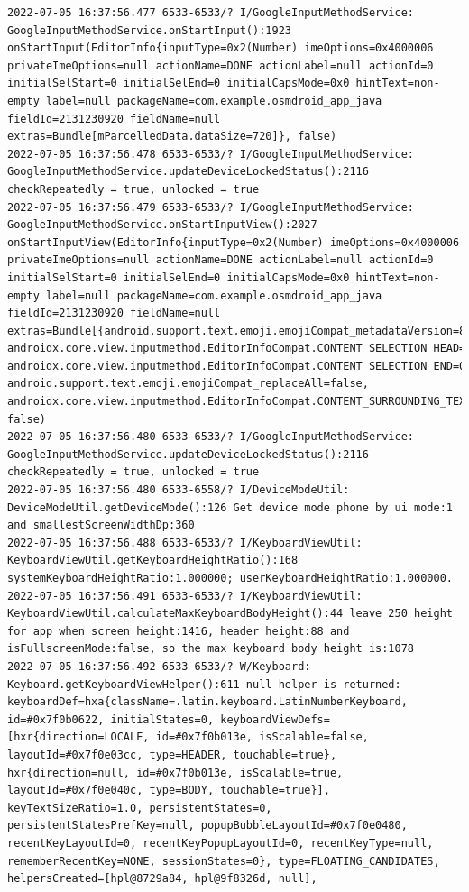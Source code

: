 \documentclass[a4paper,12pt]{book}
\begin{document}
\begin{lstlisting}
2022-07-05 16:37:56.477 6533-6533/? I/GoogleInputMethodService: GoogleInputMethodService.onStartInput():1923 onStartInput(EditorInfo{inputType=0x2(Number) imeOptions=0x4000006 privateImeOptions=null actionName=DONE actionLabel=null actionId=0 initialSelStart=0 initialSelEnd=0 initialCapsMode=0x0 hintText=non-empty label=null packageName=com.example.osmdroid_app_java fieldId=2131230920 fieldName=null extras=Bundle[mParcelledData.dataSize=720]}, false)
2022-07-05 16:37:56.478 6533-6533/? I/GoogleInputMethodService: GoogleInputMethodService.updateDeviceLockedStatus():2116 checkRepeatedly = true, unlocked = true
2022-07-05 16:37:56.479 6533-6533/? I/GoogleInputMethodService: GoogleInputMethodService.onStartInputView():2027 onStartInputView(EditorInfo{inputType=0x2(Number) imeOptions=0x4000006 privateImeOptions=null actionName=DONE actionLabel=null actionId=0 initialSelStart=0 initialSelEnd=0 initialCapsMode=0x0 hintText=non-empty label=null packageName=com.example.osmdroid_app_java fieldId=2131230920 fieldName=null extras=Bundle[{android.support.text.emoji.emojiCompat_metadataVersion=8, androidx.core.view.inputmethod.EditorInfoCompat.CONTENT_SELECTION_HEAD=0, androidx.core.view.inputmethod.EditorInfoCompat.CONTENT_SELECTION_END=0, android.support.text.emoji.emojiCompat_replaceAll=false, androidx.core.view.inputmethod.EditorInfoCompat.CONTENT_SURROUNDING_TEXT=}]}, false)
2022-07-05 16:37:56.480 6533-6533/? I/GoogleInputMethodService: GoogleInputMethodService.updateDeviceLockedStatus():2116 checkRepeatedly = true, unlocked = true
2022-07-05 16:37:56.480 6533-6558/? I/DeviceModeUtil: DeviceModeUtil.getDeviceMode():126 Get device mode phone by ui mode:1 and smallestScreenWidthDp:360
2022-07-05 16:37:56.488 6533-6533/? I/KeyboardViewUtil: KeyboardViewUtil.getKeyboardHeightRatio():168 systemKeyboardHeightRatio:1.000000; userKeyboardHeightRatio:1.000000.
2022-07-05 16:37:56.491 6533-6533/? I/KeyboardViewUtil: KeyboardViewUtil.calculateMaxKeyboardBodyHeight():44 leave 250 height for app when screen height:1416, header height:88 and isFullscreenMode:false, so the max keyboard body height is:1078
2022-07-05 16:37:56.492 6533-6533/? W/Keyboard: Keyboard.getKeyboardViewHelper():611 null helper is returned: keyboardDef=hxa{className=.latin.keyboard.LatinNumberKeyboard, id=#0x7f0b0622, initialStates=0, keyboardViewDefs=[hxr{direction=LOCALE, id=#0x7f0b013e, isScalable=false, layoutId=#0x7f0e03cc, type=HEADER, touchable=true}, hxr{direction=null, id=#0x7f0b013e, isScalable=true, layoutId=#0x7f0e040c, type=BODY, touchable=true}], keyTextSizeRatio=1.0, persistentStates=0, persistentStatesPrefKey=null, popupBubbleLayoutId=#0x7f0e0480, recentKeyLayoutId=0, recentKeyPopupLayoutId=0, recentKeyType=null, rememberRecentKey=NONE, sessionStates=0}, type=FLOATING_CANDIDATES, helpersCreated=[hpl@8729a84, hpl@9f8326d, null], 

\end{lstlisting}
\end{document}
